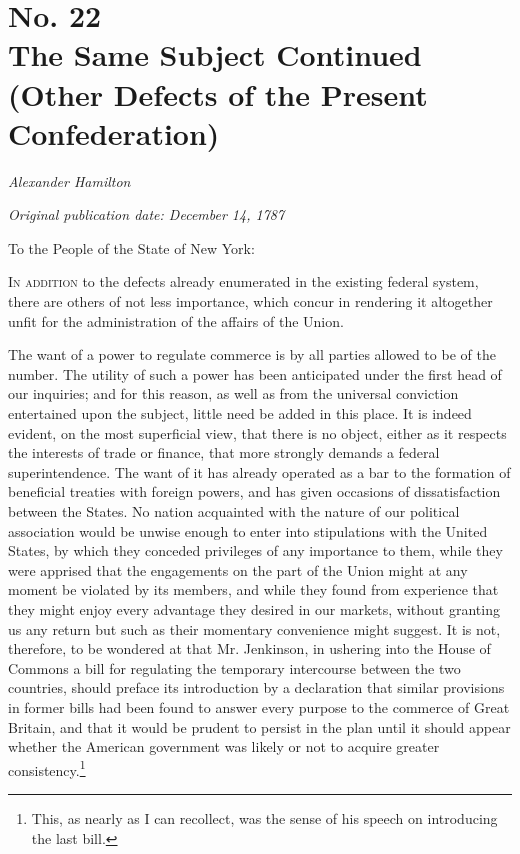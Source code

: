 \chapter[No. 22: The Same Subject Continued (Other Defects of the Present Confederation)]{No. 22\\ {\small The Same Subject Continued (Other Defects of the Present Confederation)}}

\textit{Alexander Hamilton}

\textit{Original publication date: December 14, 1787}
\vspace{1cm}

To the People of the State of New York:
\vspace{.4cm}

\textsc{In addition} to the defects already enumerated in the existing federal system, there are others of not less importance, which concur in rendering it altogether unfit for the administration of the affairs of the Union.

The want of a power to regulate commerce is by all parties allowed to be of the number. 
The utility of such a power has been anticipated under the first head of our inquiries; and for this reason, as well as from the universal conviction entertained upon the subject, little need be added in this place. 
It is indeed evident, on the most superficial view, that there is no object, either as it respects the interests of trade or finance, that more strongly demands a federal superintendence. 
The want of it has already operated as a bar to the formation of beneficial treaties with foreign powers, and has given occasions of dissatisfaction between the States. 
No nation acquainted with the nature of our political association would be unwise enough to enter into stipulations with the United States, by which they conceded privileges of any importance to them, while they were apprised that the engagements on the part of the Union might at any moment be violated by its members, and while they found from experience that they might enjoy every advantage they desired in our markets, without granting us any return but such as their momentary convenience might suggest. 
It is not, therefore, to be wondered at that Mr. 
Jenkinson, in ushering into the House of Commons a bill for regulating the temporary intercourse between the two countries, should preface its introduction by a declaration that similar provisions in former bills had been found to answer every purpose to the commerce of Great Britain, and that it would be prudent to persist in the plan until it should appear whether the American government was likely or not to acquire greater consistency.\footnote{This, as nearly as I can recollect, was the sense of his speech on introducing the last bill.}

